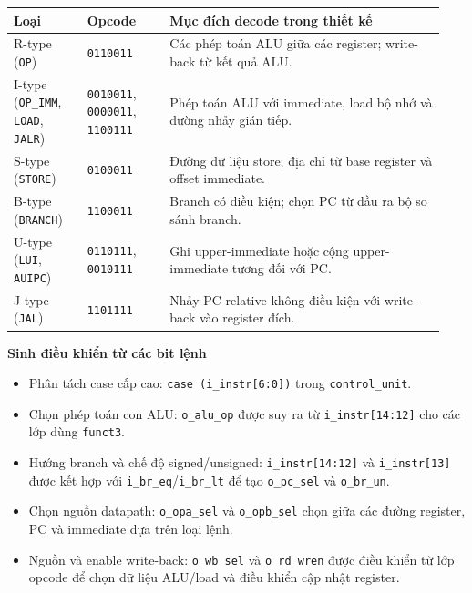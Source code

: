 \documentclass[10pt,a4paper]{article}
\begin{document}
\begin{center}
\small
\begin{tabular}{@{}p{0.16\linewidth}p{0.18\linewidth}p{0.60\linewidth}@{}}
\toprule
\textbf{Loại} & \textbf{Opcode} & \textbf{Mục đích decode trong thiết kế} \\
\midrule
R-type (\texttt{OP}) & \texttt{0110011} & Các phép toán ALU giữa các register; write-back từ kết quả ALU. \\
I-type (\texttt{OP\_IMM}, \texttt{LOAD}, \texttt{JALR}) & \texttt{0010011}, \texttt{0000011}, \texttt{1100111} & Phép toán ALU với immediate, load bộ nhớ và đường nhảy gián tiếp. \\
S-type (\texttt{STORE}) & \texttt{0100011} & Đường dữ liệu store; địa chỉ từ base register và offset immediate. \\
B-type (\texttt{BRANCH}) & \texttt{1100011} & Branch có điều kiện; chọn PC từ đầu ra bộ so sánh branch. \\
U-type (\texttt{LUI}, \texttt{AUIPC}) & \texttt{0110111}, \texttt{0010111} & Ghi upper-immediate hoặc cộng upper-immediate tương đối với PC. \\
J-type (\texttt{JAL}) & \texttt{1101111} & Nhảy PC-relative không điều kiện với write-back vào register đích. \\
\bottomrule
\end{tabular}
\end{center}

\textbf{Sinh điều khiển từ các bit lệnh}

\begin{itemize}
  \item Phân tách case cấp cao: \texttt{case (i\_instr[6:0])} trong
        \texttt{control\_unit}.
  \item Chọn phép toán con ALU: \texttt{o\_alu\_op} được suy ra từ
        \texttt{i\_instr[14:12]} cho các lớp dùng \texttt{funct3}.
  \item Hướng branch và chế độ signed/unsigned:
        \texttt{i\_instr[14:12]} và \texttt{i\_instr[13]} được kết hợp với
        \texttt{i\_br\_eq}/\texttt{i\_br\_lt} để tạo \texttt{o\_pc\_sel} và
        \texttt{o\_br\_un}.
  \item Chọn nguồn datapath: \texttt{o\_opa\_sel} và
        \texttt{o\_opb\_sel} chọn giữa các đường register, PC và immediate
        dựa trên loại lệnh.
  \item Nguồn và enable write-back: \texttt{o\_wb\_sel} và
        \texttt{o\_rd\_wren} được điều khiển từ lớp opcode để chọn dữ liệu ALU/load
        và điều khiển cập nhật register.
\end{itemize}
\end{document}
